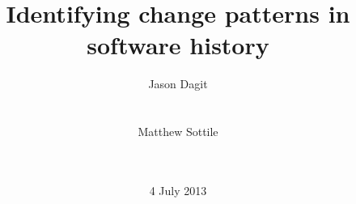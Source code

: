 \documentclass{sig-alternate-2013}
\begin{document}
\title{Identifying change patterns in software history}

%
%
%
%
%

%
\author{
%
%
\alignauthor
Jason Dagit\\
       \\
       \\
\alignauthor
Matthew Sottile\\
       \\
       \\
}
\date{4 July 2013}
\end{document}
